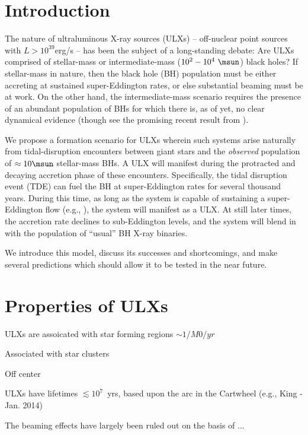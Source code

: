 \section{Introduction}\label{section:Intro}


The nature of ultraluminous X-ray sources (ULXs) -- off-nuclear point
sources with $L>10^{39}$erg/s -- has been the subject of a
long-standing debate: Are ULXs comprised of stellar-mass or
intermediate-mass ($10^{2}-10^4~\msun$) black holes?  If stellar-mass in nature, then
the black hole (BH) population must be either accreting at sustained super-Eddington
rates, or else substantial beaming must be at work.  
On the other hand, the intermediate-mass scenario requires the presence of an
abundant population of BHs for which there is, as of yet, no clear
dynamical evidence (though see the promising recent result from
\citealt{Pasham_2014}).

We propose a formation scenario for ULXs wherein
such systems arise naturally from tidal-disruption encounters between
giant stars and the {\em observed} population of $\approx 10\msun$ stellar-mass BHs.  
A ULX will manifest during the protracted and decaying
accretion phase of these encounters.  Specifically, the tidal
disruption event (TDE) can fuel the BH at super-Eddington rates for
several thousand years.   During this time, as long as the system is capable of sustaining 
a super-Eddington flow (e.g., \citep{CITATIONS}), the system will manifest as a ULX.
At still later times, the accretion rate declines to sub-Eddington
levels, and the system will blend in with the population of
``usual'' BH X-ray binaries.

We introduce this model, discuss its successes and shortcomings, and make several predictions which should allow it to be tested in the near future.  

\section{Properties of ULXs}

ULXs are assoicated with star forming regions
$\sim 1 / M0/yr$

Associated with star clusters

Off center

ULXs have lifetimes $\lesssim 10^7$~yrs, based upon the arc in the Cartwheel (e.g., King - Jan. 2014)

The beaming effects have largely been ruled out on the basis of ...

